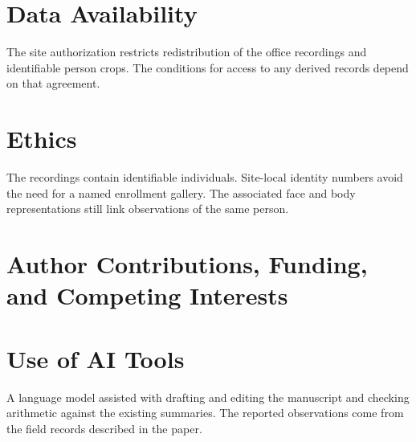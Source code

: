\documentclass[journal,letterpaper]{IEEEtran}
\newcommand{\draftnote}[3]{\par\smallskip\noindent{\footnotesize
  \textcolor{editink}{\sffamily\bfseries [#2 #1]}\enspace
  \textcolor{editink}{#3}\par}\smallskip}
\newcommand{\authorgap}[2]{\draftnote{AUTHOR}{#1}{#2}}
\begin{document}
\section*{Data Availability}
The site authorization restricts redistribution of the office recordings and identifiable person crops. The conditions for access to any derived records depend on that agreement.

\section*{Ethics}
The recordings contain identifiable individuals. Site-local identity numbers avoid the need for a named enrollment gallery. The associated face and body representations still link observations of the same person.
\authorgap{A1}{Supply the ethics review or exemption determination, consent or waiver, and the access conditions authorized for derived data.}

\section*{Author Contributions, Funding, and Competing Interests}
\authorgap{A2}{Supply the author names, affiliations, corresponding author and CRediT roles. Confirm the funding source or absence of specific funding, and any competing interests.}

\section*{Use of AI Tools}
A language model assisted with drafting and editing the manuscript and checking arithmetic against the existing summaries. The reported observations come from the field records described in the paper.
\end{document}
